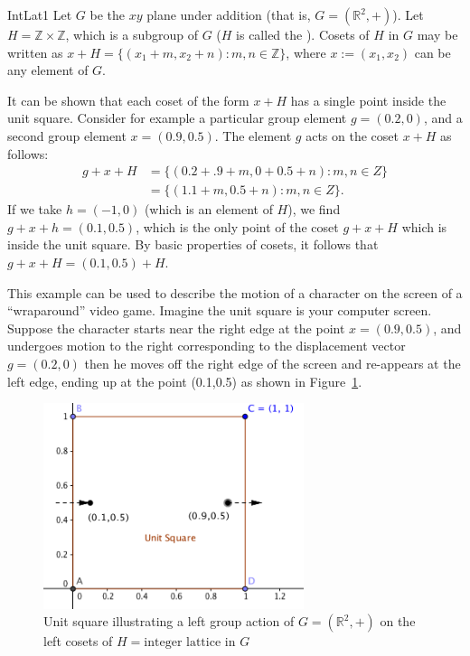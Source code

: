 \begin {example}{IntLat1}
Let $G$ be the $xy$ plane under addition (that is, $G=(\mathbb {R}^2,+)$).  Let $H=\mathbb{Z}\times \mathbb{Z}$, which is a subgroup of $G$ ($H$ is called the ).  
Cosets of $H$ in $G$ may be written as $x+H=\{(x_1+m, x_2+n):m,n \in\mathbb{ Z}\}$, where $x :=(x_1,x_2)$ can be any element of $G$.

It can be shown that each coset of the form $x+H$ has a single point inside the unit square.
Consider for example a particular group element $g=(0.2,0)$, and a second group element $x=(0.9,0.5)$. The element $g$ acts on the coset $x+H$ as follows:  
\begin{align*}
 g+x+H &=\{(0.2+.9+m, 0+0.5+n):m, n \in Z\}\\
&=\{(1.1+m, 0.5+n):m, n \in Z\}. 
\end{align*}
If we take  $h= (-1, 0)$ (which is an element of $H$), we find $g+x+h=(0.1, 0.5)$, which is the only point of the coset $g+x+H $ which is inside the unit square. By basic properties of cosets, it follows that 
$g+x+H =(0.1, 0.5)+H$. 

 This example can be used to describe the motion of a character on the screen of a ``wraparound'' video game.  Imagine the unit square is your computer screen. Suppose the character starts near
the right edge at the point $x=(0.9,0.5)$, and undergoes motion to the right corresponding to the displacement
vector $g=(0.2,0)$ then he moves off the right edge of the screen and re-appears at the left edge, ending
up at the point (0.1,0.5) as shown in Figure~\ref{fig:UnitSquare}. 
\end{example}

\begin{figure}[ht]
\begin{center}
\includegraphics[width=3in]{images/UnitSquare.png}
\caption{Unit square illustrating a left group action of $G=(\mathbb {R}^2,+)$ on the left cosets of $H=\text{integer lattice}$ in $G$ }
\label{fig:UnitSquare}
\end{center}
\end{figure}

